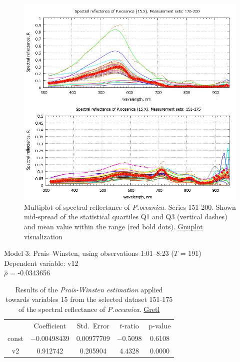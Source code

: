 \documentclass[11pt]{article}
\begin{document}
\begin{appendices}
\begin{figure}[H]
	\begin{center}
		\includegraphics[scale=0.38]{GNU-15.jpg}
		\caption{Multiplot of spectral reflectance of \textit{P.oceanica}. Series 151-200. Shown mid-spread of the statistical quartiles Q1 and Q3 (vertical dashes) and mean value within the range (red bold dots). \href{http://www.gnuplot.info/}{Gnuplot} visualization­}
		\label{fig:A.28}
	\end{center}
\end{figure}
\pagebreak

\begin{table}[H]
	\begin{center}
	\caption{Results of the \textit{Prais-Winsten estimation} applied towards variables 15 from the selected dataset 151-175 of the spectral reflectance of \textit{P.oceanica}. \href{http://gretl.sourceforge.net/}{Gretl}}
	\label{tab:26}
		Model 3: Prais--Winsten, using observations 1:01--8:23 ($T$ = 191)\\
		Dependent variable: v12\\
	$\hat{\rho}$ = -0.0343656

	\vspace{1em}

	\begin{tabular}{|c c c c c|}
		  & {Coefficient} &  {Std.\ Error} & {$t$-ratio} &   {p-value} \\[1ex]
		const &   $-$0.00498439 &     0.00977709 &       $-$0.5098 &         0.6108 \\
		v2 &   0.912742 &     0.205904 &      4.4328 &         0.0000 \\
	\end{tabular}


\end{center}
\end{table}
\end{appendices}
\end{document}
